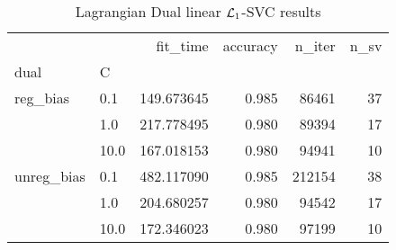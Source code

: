 \begin{table}[H]
\centering
\caption{Lagrangian Dual linear $\protect \mathcal{L}_1$-SVC results}
\label{linear_lagrangian_dual_l1_svc_cv_results}
\begin{tabular}{llrrrr}
\toprule
           &      &    fit\_time &  accuracy &  n\_iter &  n\_sv \\
dual & C &             &           &         &       \\
\midrule
reg\_bias & 0.1  &  149.673645 &     0.985 &   86461 &    37 \\
           & 1.0  &  217.778495 &     0.980 &   89394 &    17 \\
           & 10.0 &  167.018153 &     0.980 &   94941 &    10 \\
unreg\_bias & 0.1  &  482.117090 &     0.985 &  212154 &    38 \\
           & 1.0  &  204.680257 &     0.980 &   94542 &    17 \\
           & 10.0 &  172.346023 &     0.980 &   97199 &    10 \\
\bottomrule
\end{tabular}
\end{table}
